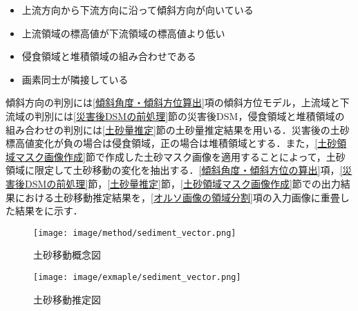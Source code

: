     \begin{itemize}
      \setlength{\itemsep}{-5pt}
      \item 上流方向から下流方向に沿って傾斜方向が向いている
      \item 上流領域の標高値が下流領域の標高値より低い
      \item 侵食領域と堆積領域の組み合わせである
      \item 画素同士が隣接している
    \end{itemize}

    傾斜方向の判別には\ref{傾斜角度・傾斜方位算出}項の傾斜方位モデル，上流域と下流域の判別には\ref{災害後DSMの前処理}節の災害後DSM，侵食領域と堆積領域の組み合わせの判別には\ref{土砂量推定}節の土砂量推定結果を用いる．災害後の土砂標高値変化が負の場合は侵食領域，正の場合は堆積領域とする．また，\ref{土砂領域マスク画像作成}節で作成した土砂マスク画像を適用することによって，土砂領域に限定して土砂移動の変化を抽出する．\ref{傾斜角度・傾斜方位の算出}項，\ref{災害後DSMの前処理}節，\ref{土砂量推定}節，\ref{土砂領域マスク画像作成}節での出力結果における土砂移動推定結果を，\ref{オルソ画像の領域分割}項の入力画像に重畳した結果をに示す．
    
    \begin{figure}[t]
      \centering
      \texttt{[image: image/method/sediment\_vector.png]}
      \caption{土砂移動概念図}
      \label{土砂移動概念図}
    \end{figure}

    \begin{figure}[t]
      \centering
      \texttt{[image: image/exmaple/sediment\_vector.png]}
      \caption{土砂移動推定図}
      \label{土砂移動推定結果}
    \end{figure}
  
